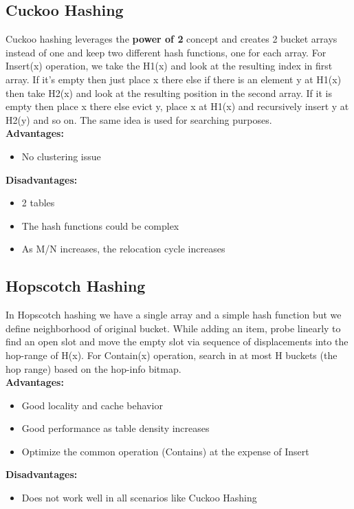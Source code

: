 \documentclass[twoside]{article}
\begin{document}
\subsection{Cuckoo Hashing}
Cuckoo hashing leverages the \textbf{power of 2} concept and creates 2 bucket arrays instead of one and keep two different hash functions, one for each array. For Insert(x) operation, we take the H1(x) and look at the resulting index in first array. If it's empty then just place x there else if there is an element y at H1(x) then take H2(x) and look at the resulting position in the second array. If it is empty then place x there else evict y, place x at H1(x) and recursively insert y at H2(y) and so on. The same idea is used for searching purposes.\\
\textbf{Advantages:}
\begin{itemize}
\item No clustering issue
\end{itemize}
\textbf{Disadvantages:}
\begin{itemize}
\item 2 tables
\item The hash functions could be complex
\item As M/N increases, the relocation cycle increases
\end{itemize}   

\subsection{Hopscotch Hashing}
In Hopscotch hashing we have a single array and a simple hash function but we define neighborhood of original bucket. While adding an item, probe linearly to find an open slot and move the empty slot via sequence of displacements into the hop-range of H(x). For Contain(x) operation, search in at most H buckets (the hop range) based on the hop-info bitmap. \\
\textbf{Advantages:}
\begin{itemize}
\item Good locality and cache behavior
\item Good performance as table density increases
\item Optimize the common operation (Contains) at the expense of Insert
\end{itemize}
\textbf{Disadvantages:}
\begin{itemize}
\item Does not work well in all scenarios like Cuckoo Hashing
\end{itemize}   
 
\end{document}
